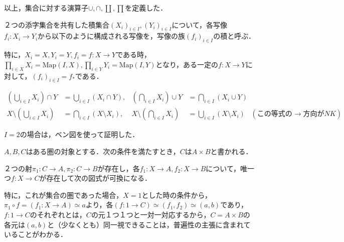 \documentclass[uplatex, 12pt, dvipdfmx]{jsreport}
\begin{document}
以上，集合に対する演算子$\cup,\cap,\coprod,\prod$を定義した．
\begin{definition}[写像の積]
    ２つの添字集合を共有した積集合$(X_i)_{i\in I},(Y_i)_{i\in I}$について，各写像$f_i:X_i\to Y_i$から以下のように構成される写像を，写像の族$(f_i)_{i\in I}$の積と呼ぶ．
    \begin{center}\end{center}
    特に，$X_i=X, Y_i=Y, f_i=f:X\to Y$である時，$\prod_{i\in X}X_i=\mathrm{Map}(I,X), \prod_{i\in Y}Y_i=\mathrm{Map}(I,Y)$となり，ある一定の$f:X\to Y$に対して，$(f_i)_{i\in I}=f_*$である．
\end{definition}


\begin{proposition}
    \begin{align*}
        \left(\bigcup_{i\in I}X_i\right)\cap Y &= \bigcup_{i\in I}(X_i\cap Y), &\left(\bigcap_{i\in I}X_i\right)\cup Y &= \bigcap_{i\in I}(X_i\cup Y)\\
        X\setminus\left(\bigcup_{i\in I}X_i\right)&=\bigcap_{i\in I}(X\setminus X_i), &X\setminus\left(\bigcap_{i\in I}X_i\right)&=\bigcup_{i\in I}(X\setminus X_i)\;\;\;(この等式の\rightarrow 方向がNK)
    \end{align*}
\end{proposition}
$I=2$の場合は，ベン図を使って証明した．

\begin{shadebox}\begin{definition}[積の普遍性]
    $A,B,C$はある圏の対象とする．次の条件を満たすとき，$C$は$A\times B$と書かれる．

    ２つの射$\pi_1:C\to A,\pi_2:C\to B$が存在し，各$f_1:X\to A, f_2:X\to B$について，唯一つ$f:X\to C$が存在して次の図式が可換になる．

    \begin{center}\end{center}
\end{definition}\end{shadebox}
特に，これが集合の圏であった場合，$X=1$とした時の条件から，$\pi_1\circ f = (f_1:X\to A) \simeq a$より，各$(f:1\to C) \simeq (f_1,f_2) \simeq (a,b)$であり，$f:1\to C$のそれぞれとは，$C$の元１つ１つと一対一対応するから，$C=A\times B$の各元は$(a,b)$と（少なくとも）同一視できることは，普遍性の主張に含まれていることがわかる．
\end{document}

